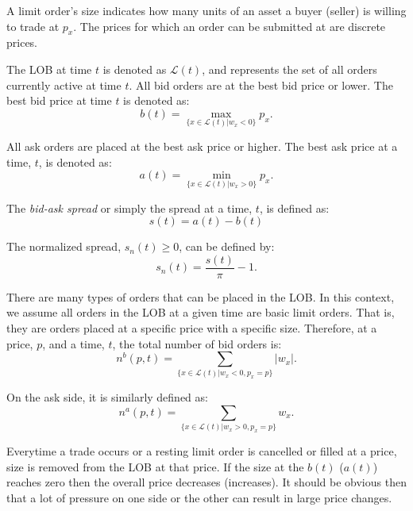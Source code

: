 A limit order's size indicates how many units of an asset a buyer (seller) is willing to trade at $p_x$. The prices for which an order can be submitted at are discrete prices. 

The LOB at time $t$ is denoted as $\mathcal{L}(t)$, and represents the set of all orders currently active at time $t$. All bid orders are at the best bid price or lower. The best bid price at time $t$ is denoted as:
\begin{equation}
\label{top_bid}
b(t) =  \max_{\{x \in \mathcal{L}(t)|w_x<0 \}} p_x.
\end{equation}

All ask orders are placed at the best ask price or higher. The best ask price at a time, $t$, is denoted as:
\begin{equation}
\label{top_ask}
a(t) = \min_{\{x \in \mathcal{L}(t)|w_x>0 \}} p_x.
\end{equation}

The \textit{bid-ask spread} or simply the spread at a time, $t$, is defined as:
\begin{equation}
s(t) = a(t) - b(t)
\end{equation}

The normalized spread, $s_n(t) \geq 0$, can be defined by: 
\begin{equation}
s_n(t) = \frac{s(t)}{\pi} - 1.
\end{equation}

There are many types of orders that can be placed in the LOB. In this context, we assume all orders in the LOB at a given time are basic limit orders. That is, they are orders placed at a specific price with a specific size. Therefore, at a price, $p$, and a time, $t$, the total number of bid orders is:
\begin{equation}
\label{bid_qty}
n^b(p, t) = \sum_{\{x \in \mathcal{L}(t)|w_x<0 , p_x=p\}} |w_x|.
\end{equation}

On the ask side, it is similarly defined as:
\begin{equation}
\label{ask_qty}
n^a(p, t) = \sum_{\{x \in \mathcal{L}(t)|w_x>0 , p_x=p\}}  w_x.
\end{equation}

Everytime a trade occurs or a resting limit order is cancelled or filled at a price, size is removed from the LOB at that price. If the size at the $b(t)$ ($a(t)$) reaches zero then the overall price decreases (increases). It should be obvious then that a lot of pressure on one side or the other can result in large price changes.

